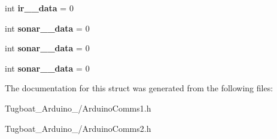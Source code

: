 \begin{DoxyCompactItemize}
\item 
int {\bfseries ir\+\_\+\_\+data} = 0\hypertarget{struct_s_e_n_d___d_a_t_a___s_t_r_u_c_t_u_r_e_a1f03f46b1621ed4b2ed2f113108fe518}{}\label{struct_s_e_n_d___d_a_t_a___s_t_r_u_c_t_u_r_e_a1f03f46b1621ed4b2ed2f113108fe518}

\item 
int {\bfseries sonar\+\_\+\_\+data} = 0\hypertarget{struct_s_e_n_d___d_a_t_a___s_t_r_u_c_t_u_r_e_a068e6175f21d5bbfdc5ea36c02e63383}{}\label{struct_s_e_n_d___d_a_t_a___s_t_r_u_c_t_u_r_e_a068e6175f21d5bbfdc5ea36c02e63383}

\item 
int {\bfseries sonar\+\_\+\_\+data} = 0\hypertarget{struct_s_e_n_d___d_a_t_a___s_t_r_u_c_t_u_r_e_a5d8f2356332f1d8361ffa71439ad6409}{}\label{struct_s_e_n_d___d_a_t_a___s_t_r_u_c_t_u_r_e_a5d8f2356332f1d8361ffa71439ad6409}

\item 
int {\bfseries sonar\+\_\+\_\+data} = 0\hypertarget{struct_s_e_n_d___d_a_t_a___s_t_r_u_c_t_u_r_e_a2712af20c5b2949c218afbe15f97745e}{}\label{struct_s_e_n_d___d_a_t_a___s_t_r_u_c_t_u_r_e_a2712af20c5b2949c218afbe15f97745e}

\end{DoxyCompactItemize}


The documentation for this struct was generated from the following files\+:\begin{DoxyCompactItemize}
\item 
Tugboat\+\_\+\+Arduino\+\_/Arduino\+Comms1.\+h\item 
Tugboat\+\_\+\+Arduino\+\_/Arduino\+Comms2.\+h\end{DoxyCompactItemize}
